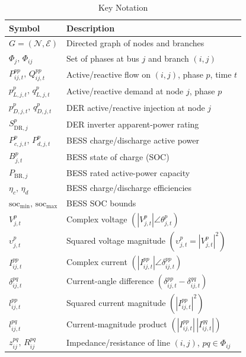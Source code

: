 \begin{table}[H]
  \centering
  \caption{Key Notation}
  \label{tab:notation}
  \begin{tabular}{ll}
    \toprule
    Symbol & Description \\
    \midrule
    \(G=(\mathcal{N},\mathcal{E})\) & Directed graph of nodes and branches \\
    \(\Phi_j,\,\Phi_{ij}\) & Set of phases at bus \(j\) and branch \((i,j)\) \\
    \(P^{pp}_{ij,t},\,Q^{pp}_{ij,t}\) & Active/reactive flow on \((i,j)\), phase \(p\), time \(t\) \\
    \(p^{p}_{L,j,t},\,q^{p}_{L,j,t}\) & Active/reactive demand at node \(j\), phase \(p\) \\
    \(p^{p}_{D,j,t},\,q^{p}_{D,j,t}\) & DER active/reactive injection at node \(j\) \\
    \(S^{p}_{\mathrm{DR},j}\) & DER inverter apparent-power rating \\
    \(P^{p}_{c,j,t},\,P^{p}_{d,j,t}\) & BESS charge/discharge active power \\
    \(B^{p}_{j,t}\) & BESS state of charge (SOC) \\
    \(P_{\mathrm{BR},j}\) & BESS rated active-power capacity \\
    \(\eta_c,\,\eta_d\) & BESS charge/discharge efficiencies \\
    \(\mathrm{soc}_{\min},\,\mathrm{soc}_{\max}\) & BESS SOC bounds \\
    \(V^{p}_{j,t}\) & Complex voltage \((|V^{p}_{j,t}|\angle\theta^{p}_{j,t})\) \\[2pt]
    \(\upsilon^{p}_{j,t}\) & Squared voltage magnitude \((\upsilon^{p}_{j,t}=|V^{p}_{j,t}|^2)\) \\[2pt]
    \(I^{pp}_{ij,t}\) & Complex current \((|I^{pp}_{ij,t}|\angle\delta^{pp}_{ij,t})\) \\[2pt]
    \(\delta^{pq}_{ij,t}\) & Current-angle difference \((\delta^{pp}_{ij,t}-\delta^{qq}_{ij,t})\) \\[2pt]
    \(l^{pp}_{ij,t}\) & Squared current magnitude \((|I^{pp}_{ij,t}|^2)\) \\[2pt]
    \(l^{pq}_{ij,t}\) & Current-magnitude product \((|I^{pp}_{ij,t}|\,|I^{qq}_{ij,t}|)\) \\[2pt]
    \(z^{pq}_{ij},\,R^{pq}_{ij}\) & Impedance/resistance of line \((i,j)\), \(pq\in\Phi_{ij}\) \\
    \bottomrule
  \end{tabular}
\end{table}

